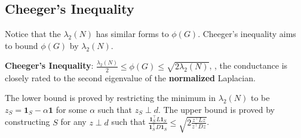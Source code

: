\subsection{Cheeger's Inequality}

Notice that the $\lambda_2(N)$ has similar forms to $\phi(G)$. Cheeger's inequality aims to bound $\phi(G)$ by $\lambda_2(N)$.

\textbf{Cheeger's Inequality}: $\frac{\lambda_2(N)}{2} \le \phi(G) \le \sqrt{2\lambda_2(N)}$, \ie, the conductance is closely rated to the second eigenvalue of the \textbf{normalized} Laplacian.

The lower bound is proved by restricting the minimum in $\lambda_2(N)$ to be $z_S = \boldsymbol{1}_S - \alpha \boldsymbol{1}$ for some $\alpha$ such that $z_S \perp d$. The upper bound is proved by constructing $S$ for any $z \perp d$ such that $\frac{\boldsymbol{1}_S^\top L \boldsymbol{1}_S}{\boldsymbol{1}_S^\top D \boldsymbol{1}_S} \le \sqrt{2 \frac{z^\top L z}{z^\top D z}}$.

